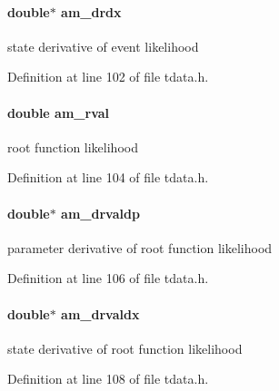 \paragraph[{am\+\_\+drdx}]{\setlength{\rightskip}{0pt plus 5cm}double$\ast$ am\+\_\+drdx}\label{struct_temp_data_a0fb069ba24e8e90df621dd29ec4c84f7}
state derivative of event likelihood 

Definition at line 102 of file tdata.\+h.

\hypertarget{struct_temp_data_a64ffad68a060a30c8a0c665c65784dfc}{}
\paragraph[{am\+\_\+rval}]{\setlength{\rightskip}{0pt plus 5cm}double am\+\_\+rval}\label{struct_temp_data_a64ffad68a060a30c8a0c665c65784dfc}
root function likelihood 

Definition at line 104 of file tdata.\+h.

\hypertarget{struct_temp_data_aeb64dd8f56bebc4a6228eec5c4131aad}{}
\paragraph[{am\+\_\+drvaldp}]{\setlength{\rightskip}{0pt plus 5cm}double$\ast$ am\+\_\+drvaldp}\label{struct_temp_data_aeb64dd8f56bebc4a6228eec5c4131aad}
parameter derivative of root function likelihood 

Definition at line 106 of file tdata.\+h.

\hypertarget{struct_temp_data_acdc5967fa5a5aab617a1e41269f57935}{}
\paragraph[{am\+\_\+drvaldx}]{\setlength{\rightskip}{0pt plus 5cm}double$\ast$ am\+\_\+drvaldx}\label{struct_temp_data_acdc5967fa5a5aab617a1e41269f57935}
state derivative of root function likelihood 

Definition at line 108 of file tdata.\+h.

\hypertarget{struct_temp_data_a5fea9eb6e03adbeb2e5c613f00078200}{}
